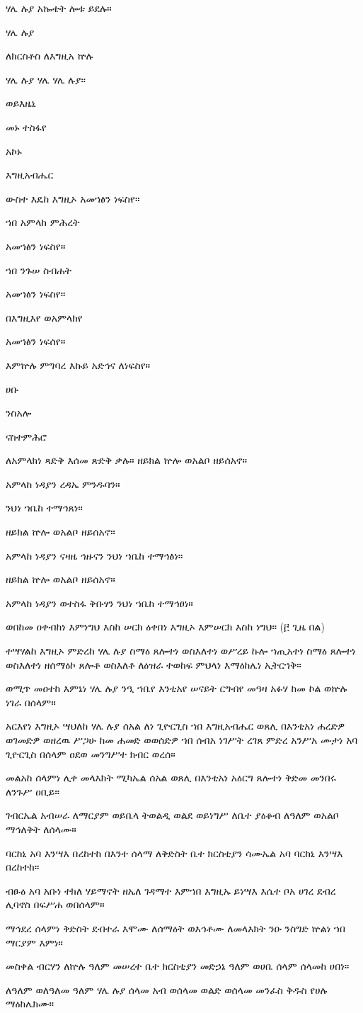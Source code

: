 ሃሌ ሉያ አኰቴት ሎቱ ይደሉ።
 
ሃሌ ሉያ

ለክርስቶስ ለእግዚአ ኵሉ 

ሃሌ ሉያ ሃሌ ሃሌ ሉያ።

ወይእዜኒ 

መኑ ተስፋየ

አኮኑ 

እግዚአብሔር

ውስተ እዴከ እግዚኦ አመኀፅን ነፍስየ። 

ኀበ አምላከ ምሕረት

አመኀፅን ነፍስየ። 

ኀበ ንጉሠ ስብሐት 

አመኀፅን ነፍስየ። 

በእግዚእየ ወአምላክየ

አመኀፅን ነፍሰየ።

እምኵሉ ምግባረ እኩይ አድኅና ለነፍስየ። 

ሀቡ 

ንስአሎ 

ናስተምሕሮ

ለአምላክነ ጻድቅ እሰመ ጽድቅ ቃሉ።
ዘይክል ኵሎ ወአልቦ ዘይሰአኖ። 

አምላከ ነዳያን ረዳኤ ምንዱባን። 

ንህነ ኀቤከ ተማኅጸነ።

ዘይክል ኵሎ ወአልቦ ዘይሰአኖ። 

አምላከ ነዳያን ናዛዜ ኅዙናን ንህነ ኀቤከ ተማኅፅነ።

ዘይክል ኵሎ ወአልቦ ዘይሰአኖ።

አምላከ ነዳያን ወተስፋ ቅቡፃን
ንህነ ኀቤከ ተማኅፀነ።

ወበከመ ዐቀብከነ እምነግህ እስከ ሠርክ ዕቀበነ እግዚኦ እምሠርክ እስከ ነግህ። (፫ ጊዜ በል)

ተሣሃልከ እግዚኦ ምድረከ ሃሌ ሉያ ስማዕ ጸሎተነ ወስእለተነ ወሥረይ ኩሎ ኀጢአተነ ስማዕ ጸሎተነ ወስእለተነ ዘሰማዕኮ ጸሎቶ ወስእለቶ ለዕዝራ ተወከፍ ምህላነ እማዕከሌነ ኢትርኀቅ።

ወሚጥ መዐተከ እምኔነ ሃሌ ሉያ ንዒ ኀቤየ እንቲአየ ሠናይት ርግብየ መዓዛ አፉሃ ከመ ኮል ወኵሉ ነገራ በሰላም።

አርእየነ እግዚኦ ሣህለከ ሃሌ ሉያ ሰአል ለነ ጊዮርጊስ ኀበ እግዚአብሔር ወጸሊ በእንቲአነ ሐረድዎ ወገመድዎ ወዘረዉ ሥጋሁ ከመ ሐመድ ወወሰድዎ ኀበ ሰብአ ነገሥት ረገጸ ምድረ አንሥአ ሙታነ አባ ጊዮርጊስ በሰላም ዐደወ መንግሥተ ክብር ወረሰ።

መልአከ ሰላምነ ሊቀ መላእክት ሚካኤል ሰአል ወጸሊ በእንቲአነ አዕርግ ጸሎተነ ቅድመ መንበሩ ለንጉሥ ዐቢይ።

ገብርኤል አብሠራ ለማርያም ወይቤላ ትወልዲ ወልደ ወይነግሥ ለቤተ ያዕቆብ ለዓለም ወአልቦ ማኅለቅት ለሰላሙ።

 ባርከኒ አባ እንሣእ በረከተከ በእንተ ሰላማ ለቅድስት ቤተ ክርስቲያን ሳሙኤል አባ ባርከኒ እንሣእ በረከተከ።

ብፁዕ አባ አቡነ ተክለ ሃይማኖት ዘኤለ ገዳማተ እምኀበ እግዚኡ ይነሣእ እሴተ ቦአ ሀገረ ደብረ ሊባኖስ በፍሥሐ ወበሰላም።

ማኅደረ ሰላምነ ቅድስት ደብተራ እሞሙ ለሰማዕት ወእኅቶሙ ለመላእክት ንዑ ንስግድ ኵልነ ኀበ ማርያም እምነ።

መስቀል ብርሃን ለኵሉ ዓለም መሠረተ ቤተ ክርስቲያን መድኃኔ ዓለም ወሀቤ ሰላም ሰላመከ ሀበነ።

ለዓለም ወለዓለመ ዓለም ሃሌ ሉያ ሰላመ አብ ወሰላመ ወልድ ወሰላመ መንፈስ ቅዱስ የሀሉ ማዕከሌክሙ።
